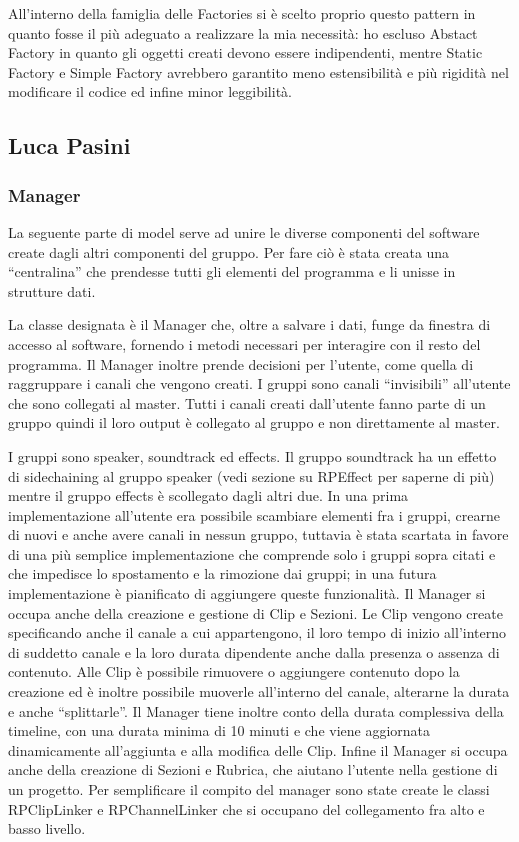 \documentclass[a4paper,12pt]{report}
\begin{document}
All’interno della famiglia delle Factories si è scelto proprio questo pattern in quanto fosse il più adeguato a realizzare la mia necessità: ho escluso Abstact Factory in quanto gli oggetti creati devono essere indipendenti, mentre Static Factory e Simple Factory avrebbero garantito meno estensibilità e più rigidità nel modificare il codice ed infine minor leggibilità.
\endsubsubsection
\endsubsection

\subsection{Luca Pasini}
\subsubsection{Manager}
La seguente parte di model serve ad unire le diverse componenti del software create dagli altri componenti del gruppo. Per fare ciò è stata creata una “centralina” che prendesse tutti gli elementi del programma e li unisse in strutture dati. 

La classe designata è il Manager che, oltre a salvare i dati, funge da finestra di accesso al software, fornendo i metodi necessari per interagire con il resto del programma. Il Manager inoltre prende decisioni per l’utente, come quella di raggruppare i canali che vengono creati. I gruppi sono canali “invisibili” all’utente che sono collegati al master. Tutti i canali creati dall’utente fanno parte di un gruppo quindi il loro output è collegato al gruppo e non direttamente al master.

I gruppi sono speaker, soundtrack ed effects. Il gruppo soundtrack ha un effetto di sidechaining al gruppo speaker (vedi sezione su RPEffect per saperne di più) mentre il gruppo effects è scollegato dagli altri due. In una prima implementazione all’utente era possibile scambiare elementi fra i gruppi, crearne di nuovi e anche avere canali in nessun gruppo, tuttavia è stata scartata in favore di una più semplice implementazione che comprende solo i gruppi sopra citati e che impedisce lo spostamento e la rimozione dai gruppi; in una futura implementazione è pianificato di aggiungere queste funzionalità. Il Manager si occupa anche della creazione e gestione di Clip e Sezioni. Le Clip vengono create specificando anche il canale a cui appartengono, il loro tempo di inizio all’interno di suddetto canale e la loro durata dipendente anche dalla presenza o assenza di contenuto. Alle Clip è possibile rimuovere o aggiungere contenuto dopo la creazione ed è inoltre possibile muoverle all’interno del canale, alterarne la durata e anche “splittarle”. Il Manager tiene inoltre conto della durata complessiva della timeline, con una durata minima di 10 minuti e che viene aggiornata dinamicamente all’aggiunta e alla modifica delle Clip. Infine il Manager si occupa anche della creazione di Sezioni e Rubrica, che aiutano l’utente nella gestione di un progetto. Per semplificare il compito del manager sono state create le classi RPClipLinker e RPChannelLinker che si occupano del collegamento fra alto e basso livello.
\end{document}
